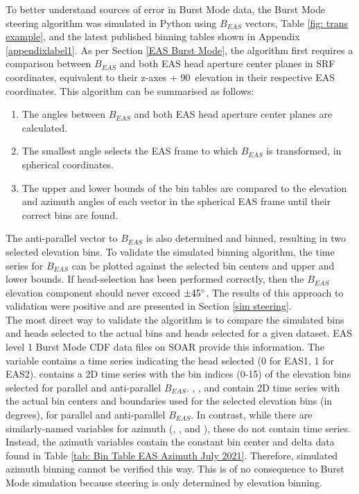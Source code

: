 To better understand sources of error in Burst Mode data, the Burst Mode steering algorithm was simulated in Python using \(B_{EAS}\) vectors, Table \ref{fig: trans example}, and the latest published binning tables shown in Appendix \ref{appendixlabel1}. As per Section \ref{EAS Burst Mode}, the algorithm first requires a comparison between \(B_{EAS}\) and both EAS head aperture center planes in SRF coordinates, equivalent to their z-axes + 90\degree\ elevation in their respective EAS coordinates. This algorithm can be summarised as follows: 

\begin{enumerate}
    \item The angles between \(B_{EAS}\) and both EAS head aperture center planes are calculated.
    \item The smallest angle selects the EAS frame to which \(B_{EAS}\) is transformed, in spherical coordinates.
    \item The upper and lower bounds of the bin tables are compared to the elevation and azimuth angles of each vector in the spherical EAS frame until their correct bins are found.
\end{enumerate}

The anti-parallel vector to \(B_{EAS}\) is also determined and binned, resulting in two selected elevation bins. 
To validate the simulated binning algorithm, the time series for \(B_{EAS}\) can be plotted against the selected bin centers and upper and lower bounds. If head-selection has been performed correctly, then the \(B_{EAS}\) elevation component should never exceed \(\pm45\degree\). The results of this approach to validation were positive and are presented in Section \ref{sim steering}.
\\

The most direct way to validate the algorithm is to compare the simulated bins and heads selected to the actual bins and heads selected for a given dataset. EAS level 1 Burst Mode CDF data files on SOAR provide this information. The variable  contains a time series indicating the head selected (0 for EAS1, 1 for EAS2).  contains a 2D time series with the bin indices (0-15) of the elevation bins selected for parallel and anti-parallel \(B_{EAS}\). , , and  contain 2D time series with the actual bin centers and boundaries used for the selected elevation bins (in degrees), for parallel and anti-parallel \(B_{EAS}\). In contrast, while there are similarly-named variables for azimuth (, , and ), these do not contain time series. Instead, the azimuth variables contain the constant bin center and delta data found in Table \ref{tab: Bin Table EAS Azimuth July 2021}. Therefore, simulated azimuth binning cannot be verified this way. This is of no consequence to Burst Mode simulation because steering is only determined by elevation binning.
\\

